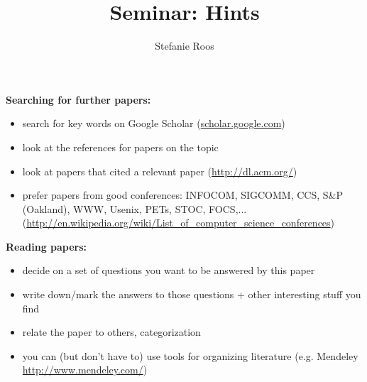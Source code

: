 \documentclass{article}
\title{Seminar: Hints}
\date{}
\author{Stefanie Roos}
\begin{document}
\maketitle

\textbf{Searching for further papers: }
\begin{itemize}
\item search for key words on Google Scholar (\url{scholar.google.com})
\item look at the references for papers on the topic
\item look at papers that cited a relevant paper (\url{http://dl.acm.org/})
\item prefer papers from good conferences: INFOCOM, SIGCOMM, CCS, S\&P (Oakland), WWW, Usenix, PETs, STOC, FOCS,... (\url{http://en.wikipedia.org/wiki/List_of_computer_science_conferences})
\end{itemize}

\textbf{Reading papers: }
\begin{itemize}
\item decide on a set of questions you want to be answered by this paper
\item write down/mark the answers to those questions + other interesting stuff you find
\item relate the paper to others, categorization 
\item you can (but don't have to) use tools for organizing literature (e.g. Mendeley \url{http://www.mendeley.com/}) 
\end{itemize}
\end{document}
